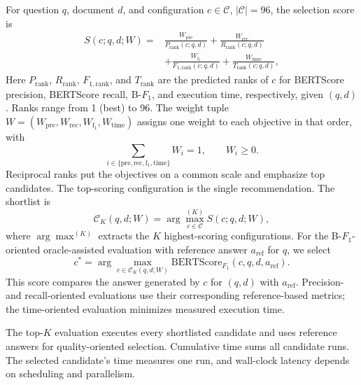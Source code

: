 \label{sec3.4}
For question $q$, document $d$, and configuration $c\in\mathcal{C}$, $|\mathcal{C}|=96$, the selection score is
\begin{equation}
\begin{aligned}
S(c;q,d;W)={}&\frac{W_{\mathrm{pre}}}{P_{\mathrm{rank}}(c;q,d)}+\frac{W_{\mathrm{rec}}}{R_{\mathrm{rank}}(c;q,d)}\\
&+\frac{W_{\mathrm{f_1}}}{F_{1,\mathrm{rank}}(c;q,d)}+\frac{W_{\mathrm{time}}}{T_{\mathrm{rank}}(c;q,d)},
\end{aligned}\label{eq1}
\end{equation}
Here $P_{\mathrm{rank}}$, $R_{\mathrm{rank}}$, $F_{1,\mathrm{rank}}$, and $T_{\mathrm{rank}}$ are the predicted ranks of $c$ for BERTScore precision, BERTScore recall, B-$F_1$, and execution time, respectively, given $(q,d)$. Ranks range from 1 (best) to 96. The weight tuple $W=(W_{\mathrm{pre}},W_{\mathrm{rec}},W_{\mathrm{f_1}},W_{\mathrm{time}})$ assigns one weight to each objective in that order, with
\begin{equation}
\sum_{i\in\{\mathrm{pre,rec,f_1,time}\}}W_i=1,\qquad W_i\geq0.
\label{eq2}
\end{equation}
Reciprocal ranks put the objectives on a common scale and emphasize top candidates. The top-scoring configuration is the single recommendation. The shortlist is
\begin{equation}
\mathcal{C}_K(q,d;W)=\arg\max_{c\in\mathcal{C}}^{(K)} S(c;q,d;W),
\label{eq3}
\end{equation}
where $\arg\max^{(K)}$ extracts the $K$ highest-scoring configurations. For the B-$F_1$-oriented oracle-assisted evaluation with reference answer $a_{\mathrm{ref}}$ for $q$, we select
\begin{equation}
c^*=\arg\max_{c\in\mathcal{C}_K(q,d;W)}\mathrm{BERTScore}_{F_1}(c,q,d,a_{\mathrm{ref}}).
\label{eq4}
\end{equation}
This score compares the answer generated by $c$ for $(q,d)$ with $a_{\mathrm{ref}}$. Precision- and recall-oriented evaluations use their corresponding reference-based metrics; the time-oriented evaluation minimizes measured execution time.

The top-$K$ evaluation executes every shortlisted candidate and uses reference answers for quality-oriented selection. Cumulative time sums all candidate runs. The selected candidate's time measures one run, and wall-clock latency depends on scheduling and parallelism.
